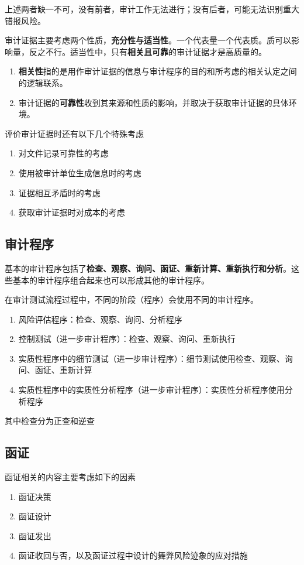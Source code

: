\documentclass[UTF8,12pt]{ctexart}
\numberwithin{equation}{section} %
\numberwithin{figure}{section}
\numberwithin{table}{section}
\begin{document}
	上述两者缺一不可，没有前者，审计工作无法进行；没有后者，可能无法识别重大错报风险。
	
	审计证据主要考虑两个性质，\textbf{充分性与适当性}。一个代表量一个代表质。质可以影响量，反之不行。适当性中，只有\textbf{相关且可靠}的审计证据才是高质量的。
	\begin{enumerate}
		\item \textbf{相关性}指的是用作审计证据的信息与审计程序的目的和所考虑的相关认定之间的逻辑联系。
		
		\item 审计证据的\textbf{可靠性}收到其来源和性质的影响，并取决于获取审计证据的具体环境。
	\end{enumerate}
	
	评价审计证据时还有以下几个特殊考虑
	\begin{enumerate}
		\item 对文件记录可靠性的考虑
		
		\item 使用被审计单位生成信息时的考虑
		
		\item 证据相互矛盾时的考虑
		
		\item 获取审计证据时对成本的考虑
	\end{enumerate}
	
	\subsection{审计程序}
	基本的审计程序包括了\textbf{检查、观察、询问、函证、重新计算、重新执行和分析}。这些基本的审计程序组合起来也可以形成其他的审计程序。
	
	在审计测试流程过程中，不同的阶段（程序）会使用不同的审计程序。
	\begin{enumerate}
		\item 风险评估程序：检查、观察、询问、分析程序
		
		\item 控制测试（进一步审计程序）：检查、观察、询问、重新执行
		
		\item 实质性程序中的细节测试（进一步审计程序）：细节测试使用检查、观察、询问、函证、重新计算
		
		\item 实质性程序中的实质性分析程序（进一步审计程序）：实质性分析程序使用分析程序
	\end{enumerate}
	
	其中检查分为正查和逆查
	
	\subsection{函证}
	函证相关的内容主要考虑如下的因素
	\begin{enumerate}
		\item 函证决策
		
		\item 函证设计
		
		\item 函证发出
		
		\item 函证收回与否，以及函证过程中设计的舞弊风险迹象的应对措施
	\end{enumerate}
	
\end{document}
